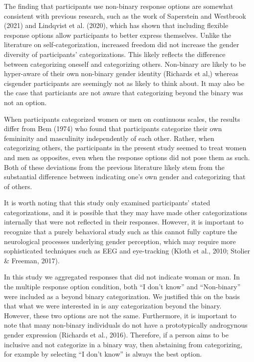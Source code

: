 \documentclass[
  man]{apa7}
\begin{document}
The finding that participants use non-binary response options are somewhat consistent with previous research, such as the work of Saperstein and Westbrook (2021) and Lindqvist et al. (2020), which has shown that including flexible response options allow participants to better express themselves. Unlike the literature on self-categorization, increased freedom did not increase the gender diversity of participants' categorizations. This likely reflects the difference between categorizing oneself and categorizing others. Non-binary are likely to be hyper-aware of their own non-binary gender identity (Richards et al,) whereas cisgender participants are seemingly not as likely to think about. It may also be the case that particiants are not aware that categorizing beyond the binary was not an option.

When participants categorized women or men on continuous scales, the results differ from Bem (1974) who found that participants categorize their own femininity and masculinity independently of each other. Rather, when categorizing others, the participants in the present study seemed to treat women and men as opposites, even when the response options did not pose them as such. Both of these deviations from the previous literature likely stem from the substantial difference between indicating one's own gender and categorizing that of others.

It is worth noting that this study only examined participants' stated categorizations, and it is possible that they may have made other categorizations internally that were not reflected in their responses. However, it is important to recognize that a purely behavioral study such as this cannot fully capture the neurological processes underlying gender perception, which may require more sophisticated techniques such as EEG and eye-tracking (Kloth et al., 2010; Stolier \& Freeman, 2017).

In this study we aggregated responses that did not indicate woman or man. In the multiple response option condition, both ``I don't know'' and ``Non-binary'' were included as a beyond binary categorization. We justified this on the basis that what we were interested in is any categorization beyond the binary. However, these two options are not the same. Furthermore, it is important to note that many non-binary individuals do not have a prototypically androgynous gender expression (Richards et al., 2016). Therefore, if a person aims to be inclusive and not categorize in a binary way, then abstaining from categorizing, for example by selecting ``I don't know'' is always the best option.
\end{document}
